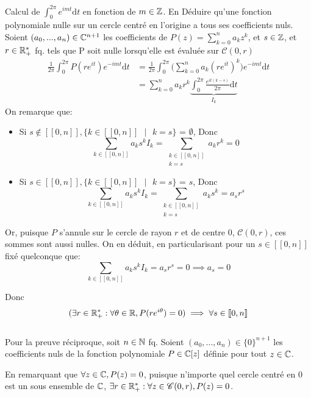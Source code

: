 \documentclass{article}
\renewenvironment{question_kholle}[2][ ]
{
	\subsection{\texorpdfstring{#2}{}}
	\notblank{#1}
	{
		\noindent #1
		\bigbreak
	}
	{}
	\begin{proof}
}
{
	\end{proof}
}
\begin{document}
\begin{question_kholle}{Calcul de $\int_0^{2\pi}e^{imt} \mathrm d t$ en fonction de $m \in \mathbb Z$. En Déduire qu'une fonction polynomiale nulle sur un cercle centré en l'origine a tous ses coefficients nuls.}
	Soient $(a_0, ..., a_n) \in \mathbb C^{n+1}$ les coefficients de $P(z) = \sum_{k=0}^n a_k z^k$, et $s\in \mathbb Z$, et $r \in \mathbb R_+^*$ fq. tels que P soit nulle lorsqu'elle est évaluée sur $\mathscr C(0,r)$
	\begin{align*}
		\frac{1}{2 \pi} \int_0^{2\pi} P(re^{it}) e^{-imt} \mathrm d t &= \frac{1}{2 \pi} \int_0^{2\pi} \bigg (\sum_{k=0}^n a_k (re^{it})^k \bigg) e^{-imt} \mathrm d t\\
		&= \sum_{k=0}^n a_k r^k \underbrace{\int_0^{2\pi} \frac{e^{it(k-s)}}{2 \pi}  \mathrm d t}_{I_k}
	\end{align*}
	On remarque que:
	\begin{itemize}
		\item Si $s \notin [ \! [0, n] \! ], \{k \in [ \! [0, n] \! ] \text{ }| \text{ } k = s\}$ = $\emptyset$, Donc $$\sum_{k \in [ \! [0, n] \! ]} a_k s^k I_k  = \sum_{\substack{k \in [ \! [0, n] \! ] \\ k = s}} a_k r^k  = 0$$
		\item Si $s \in [ \! [0, n] \! ], \{k \in [ \! [0, n] \! ] \text{ }| \text{ } k = s\}$ = ${s}$, Donc $$\sum_{k \in [ \! [0, n] \! ]} a_k s^k I_k = \sum_{\substack{k \in [ \! [0, n] \! ] \\ k = s}} a_k s^k = a_s r^s \label{1}$$
	\end{itemize}
	Or, puisque $P$ s'annule sur le cercle de rayon $r$ et de centre $0$,  $\mathscr C(0,r)$, ces sommes sont aussi nulles. On en déduit, en particularisant pour un $s \in [ \! [0, n] \! ]$ fixé quelconque que:
	$$
		\sum_{k \in [ \! [0, n] \! ]} a_k s^k I_k = a_sr^s = 0 \implies a_s = 0
	$$
	
	Donc $$
		(\exists r \in \mathbb R_+^* : \forall \theta \in \mathbb R, P(re^{i\theta})=0) \implies \forall s \in [ \! [0, n] \! ]
	$$
	\\
	Pour la preuve réciproque,  soit $n \in \mathbb N$ fq. Soient $(a_0,...,a_n) \in \{ 0 \} ^{n+1}$ les coefficients nuls de la fonction polynomiale $P \in \mathbb C[z]$ définie pour tout $z \in \mathbb C$.
	
	En remarquant que $\forall z \in \mathbb C , P(z) = 0$, puisque n'importe quel cercle centré en 0 est un sous ensemble de $\mathbb C$,  $\exists r \in \mathbb R_+^*: \forall z \in \mathscr C(0, r), P(z) = 0$.
\end{question_kholle}
\end{document}
